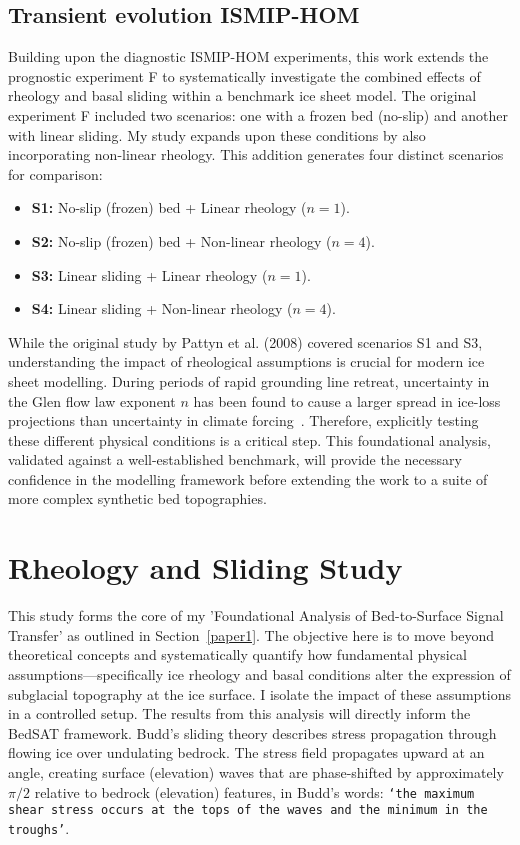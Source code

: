 \subsection{Transient evolution ISMIP-HOM}\label{transient_ismip}
Building upon the diagnostic ISMIP-HOM experiments, this work extends the prognostic experiment F to systematically investigate the combined effects of rheology and basal sliding within a benchmark ice sheet model. The original experiment F included two scenarios: one with a frozen bed (no-slip) and another with linear sliding. My study expands upon these conditions by also incorporating non-linear rheology. This addition generates four distinct scenarios for comparison:
\begin{itemize}
\item{\bf{S1}:} No-slip (frozen) bed + Linear rheology ($n=1$).
\item{\bf{S2}:} No-slip (frozen) bed + Non-linear rheology ($n=4$).
\item{\bf{S3}:} Linear sliding + Linear rheology ($n=1$).
\item{\bf{S4}:} Linear sliding + Non-linear rheology ($n=4$).
\end{itemize}
While the original study by Pattyn et al. (2008) covered scenarios S1 and S3, understanding the impact of rheological assumptions is crucial for modern ice sheet modelling. During periods of rapid grounding line retreat, uncertainty in the Glen flow law exponent $n$ has been found to cause a larger spread in ice-loss projections than uncertainty in climate forcing~\cite{Getraer_2025}. Therefore, explicitly testing these different physical conditions is a critical step. This foundational analysis, validated against a well-established benchmark, will provide the necessary confidence in the modelling framework before extending the work to a suite of more complex synthetic bed topographies.

\section{Rheology and Sliding Study}\label{study1}
This study forms the core of my 'Foundational Analysis of Bed-to-Surface Signal Transfer' as outlined in Section~\ref{paper1}. The objective here is to move beyond theoretical concepts and systematically quantify how fundamental physical assumptions—specifically ice rheology and basal conditions alter the expression of subglacial topography at the ice surface. I isolate the impact of these assumptions in a controlled setup. The results from this analysis will directly inform the BedSAT framework.
Budd's sliding theory describes stress propagation through flowing ice over undulating bedrock. The stress field propagates upward at an angle, creating surface (elevation) waves that are phase-shifted by approximately $\pi/2$ relative to bedrock (elevation) features, in Budd's words: \texttt{\texttt{`the maximum shear stress occurs at the tops of the waves and the minimum in the troughs'\cite{Budd_1970}}}.

